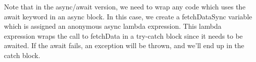 \documentclass{article}
\begin{document}
Note that in the async/await version, we need to wrap any code which uses the await keyword in an async block.
In this case, we create a fetchDataSync variable which is assigned an anonymous async lambda expression. This
lambda expression wraps the call to fetchData in a try-catch block since it needs to be awaited. If the await
fails, an exception will be thrown, and we'll end up in the catch block.
\end{document}
